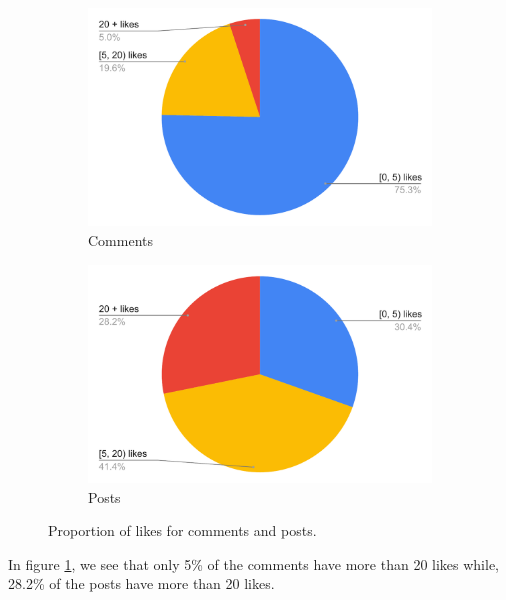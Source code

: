 \documentclass[
	12pt
] {article}
\begin{document}
	\begin{figure}[H]
		\centering
		\begin{subfigure}[b]{0.49\textwidth}
			\centering
			\includegraphics[width=\textwidth]{fig-proportion-of-comments-by-likes}
			\caption{Comments}
		\end{subfigure}
		\hfill
		\begin{subfigure}[b]{0.49\textwidth}
			\centering
			\includegraphics[width=\textwidth]{fig-proportion-of-posts-by-likes}
			\caption{Posts}
		\end{subfigure}
		\caption{Proportion of likes for comments and posts.}
		\label{fig-proportion-of-comments-or-posts-by-likes}
	\end{figure}

	In figure \ref{fig-proportion-of-comments-or-posts-by-likes}, we see that only \num{5}\% of the comments have more than \num{20} likes while, \num{28.2}\% of the posts have more than \num{20} likes.
\end{document}
